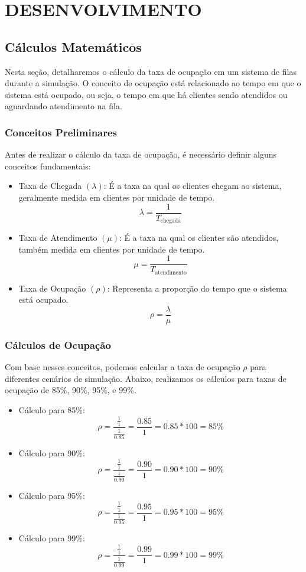 \section{\large DESENVOLVIMENTO}
\subsection{Cálculos Matemáticos}
Nesta seção, detalharemos o cálculo da taxa de ocupação em um sistema de filas durante a simulação. O conceito de ocupação está relacionado ao tempo em que o sistema está ocupado, ou seja, o tempo em que há clientes sendo atendidos ou aguardando atendimento na fila.
\subsubsection{Conceitos Preliminares}
Antes de realizar o cálculo da taxa de ocupação, é necessário definir alguns conceitos fundamentais:
\begin{itemize}
    \item    \label{cal:taxa_chegada}Taxa de Chegada $(\lambda)$: É a taxa na qual os clientes chegam ao sistema, geralmente medida em clientes por unidade de tempo.
    $$
    \lambda = \frac{1}{T_{\text{chegada}}}
    $$
    
    \item Taxa de Atendimento $(\mu)$: É a taxa na qual os clientes são atendidos, também medida em clientes por unidade de tempo.
    $$
    \mu = \frac{1}{T_{\text{atendimento}}}
    $$
    \item Taxa de Ocupação $(\rho)$: Representa a proporção do tempo que o sistema está ocupado.
    $$
    \rho = \frac{\lambda}{\mu}
    $$
\end{itemize}
\subsubsection{Cálculos de Ocupação}
Com base nesses conceitos, podemos calcular a taxa de ocupação $\rho$ para diferentes cenários de simulação. Abaixo, realizamos os cálculos para taxas de ocupação de 85\%, 90\%, 95\%, e 99\%.
\begin{itemize}
    \item    \label{cal:ocupacao85}Cálculo para 85\%:
    $$
    \rho = \frac{\frac{1}{1}}{\frac{1}{0.85}} = \frac{0.85}{1} = 0.85 * 100 = 85\%
    $$
    \item \label{cal:ocupacao90}Cálculo para 90\%:
    $$
    \rho = \frac{\frac{1}{1}}{\frac{1}{0.90}} = \frac{0.90}{1} = 0.90 * 100 = 90\%
    $$
    \item \label{cal:ocupacao95}Cálculo para 95\%:
    $$
    \rho = \frac{\frac{1}{1}}{\frac{1}{0.95}} = \frac{0.95}{1} = 0.95 *100 = 95\%
    $$
    \item\label{cal:ocupacao85} Cálculo para 99\%:
    $$
    \rho = \frac{\frac{1}{1}}{\frac{1}{0.99}} = \frac{0.99}{1} = 0.99 * 100 = 99\%
    $$
\end{itemize}

